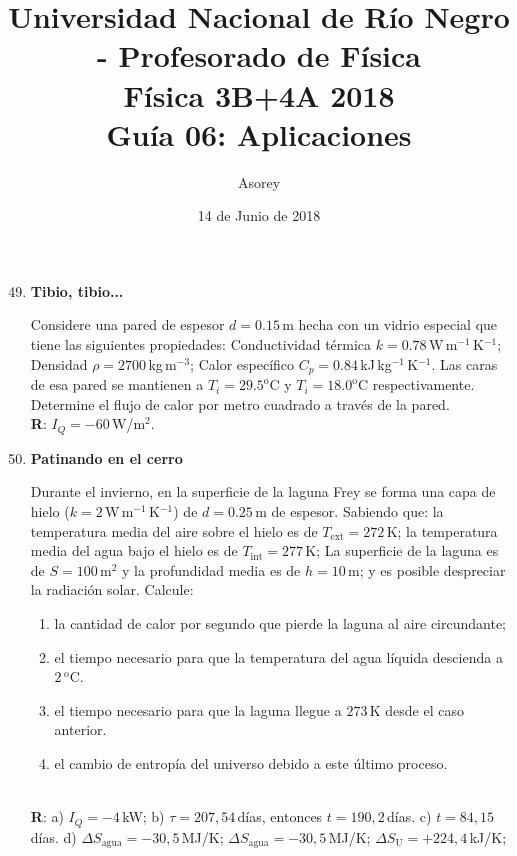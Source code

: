 \documentclass[a4paper,12pt]{article}
\begin{document}
\title{
{\normalsize{Universidad Nacional de Río Negro - Profesorado de Física}}\\
Física 3B+4A  2018 \\ Guía 06: Aplicaciones 
}
\author{Asorey}
\date{14 de Junio de 2018} 
\maketitle

\begin{enumerate}
	\setcounter{enumi}{48}      %
	\item{\bf{Tibio, tibio...}}

		Considere una pared de espesor $d=0.15$\,m hecha con un vidrio especial
		que tiene las siguientes propiedades: Conductividad térmica
		$k=0.78$\,W\,m$^{-1}$\,K$^{-1}$; Densidad $\rho = 2700$\,kg\,m$^{-3}$;
		Calor específico $C_p = 0.84$\,kJ\,kg$^{-1}$\,K$^{-1}$.  Las caras de
		esa pared se mantienen a $T_i=29.5^\mathrm{o}$C y
		$T_i=18.0^\mathrm{o}$C respectivamente. Determine el flujo de calor por
		metro cuadrado a través de la pared.
		\\{\bf{R}}: $I_Q=-60$\,W/m$^2$.
	
	\item{\bf{Patinando en el cerro}}
		
		Durante el invierno, en la superficie de la laguna Frey se forma una
		capa de hielo ($k=2$\,W\,m$^{-1}$\,K$^{-1}$) de $d=0.25$\,m de espesor.
		Sabiendo que: la temperatura media del aire sobre el hielo es de
		$T_\mathrm{ext}=272$\,K; la temperatura media del agua bajo el hielo es
		de $T_\mathrm{int}=277$\,K; La superficie de la laguna es de
		$S=100$\,m$^2$ y la profundidad media es de $h=10$\,m; y es posible
		despreciar la radiación solar. Calcule:
		\begin{enumerate}
			\item la cantidad de calor por segundo que pierde la laguna al
				aire circundante;
			\item el tiempo necesario para que la temperatura del agua líquida
				descienda a $2$\,$^\mathrm{o}$C.
			\item el tiempo necesario para que la laguna llegue a $273$\,K
				desde el caso anterior.
			\item el cambio de entropía del universo debido a este último proceso.
		\end{enumerate}
		\\{\bf{R}}: a) $I_Q=-4$\,kW; b) $\tau=207,54$\,días, entonces
		$t=190,2$\,días. c) $t=84,15$\,días. d) $\Delta
		S_{\mathrm{agua}}=-30,5$\,MJ/K; $\Delta S_{\mathrm{agua}}=-30,5$\,MJ/K;
		$\Delta S_{\mathrm{U}}=+224,4$\,kJ/K;
		

\end{enumerate}
\end{document}
